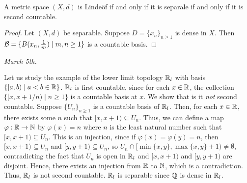 \begin{lemma}
    A metric space $(X,d)$ is Linde\"of if and only if it is separale if and only if it is second countable.
\end{lemma}
\begin{proof}
    Let $(X,d)$ be separable. Suppose $D = \{x_{n}\}_{n \geq 1}$ is dense in $X$. Then $\mathcal{B} = \{B(x_{n},\frac{1}{m}) \mid m,n \geq 1\}$ is a countable basis.
\end{proof}

\textit{March 5th.}

\begin{example}
    Let us study the example of the lower limit topology $\mathbb{R}_{l}$ with basis $\{[a,b) \mid a < b \in \mathbb{R}\}$. $\mathbb{R}_{l}$ is first countable, since for each $x \in \mathbb{R}$, the collection $\{[x,x+1/n) \mid n \geq 1\}$ is a countable basis at $x$. We show that is it \textit{not} second countable. Suppose $\{U_{n}\}_{n \geq 1}$ is a countable basis of $\mathbb{R}_{l}$. Then, for each $x \in \mathbb{R}$, there exists some $n$ such that $[x,x+1) \subseteq U_{n}$. Thus, we can define a map $\varphi : \mathbb{R} \to \mathbb{N}$ by $\varphi(x) = n$ where $n$ is the least natural number such that $[x,x+1) \subseteq U_{n}$. This is an injection, since if $\varphi(x) = \varphi(y) = n$, then $[x,x+1) \subseteq U_{n}$ and $[y,y+1) \subseteq U_{n}$, so $U_{n} \cap [\min\{x,y\},\max\{x,y\}+1) \neq \emptyset$, contradicting the fact that $U_{n}$ is open in $\mathbb{R}_{l}$ and $[x,x+1)$ and $[y,y+1)$ are disjoint. Hence, there exists an injection from $\mathbb{R}$ to $\mathbb{N}$, which is a contradiction. Thus, $\mathbb{R}_{l}$ is not second countable. $\mathbb{R}_{l}$ is separable since $\mathbb{Q}$ is dense in $\mathbb{R}_{l}$.
\end{example}

